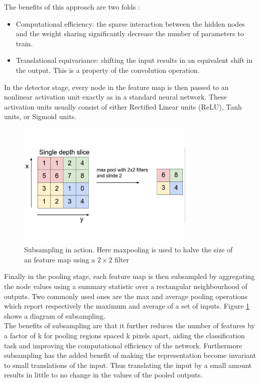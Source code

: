 \noindent The benefits of this approach are two folds :

\begin{itemize}
	\item Computational efficiency: the sparse interaction between the hidden nodes and the weight sharing significantly decrease the number of parameters to train.
	\item Translational equivariance: shifting the input results in an equivalent shift in the output. This is a property of the convolution operation.
\end{itemize}

\noindent In the detector stage, every node in the feature map is then passed to an nonlinear activation unit exactly as in a standard neural network. These activation units usually consist of either Rectified Linear units (ReLU), Tanh units, or Sigmoid units.\\

\begin{figure}
\centering
\includegraphics[trim=0cm 0cm 0cm 0cm, clip=true, height=60mm]{Chapter2/pooling.pdf}
\caption{Subsampling in action. Here maxpooling is used to halve the size of an feature map using a $2 \times 2$ filter}
\label{subsampling}
\end{figure}

\noindent Finally in the pooling stage, each feature map is then subsampled by aggregating the node values using a summary statistic over a rectangular neighbourhood of outputs. Two commonly used ones are the max and average pooling operations which report respectively the maximum and average of a set of inputs. Figure \ref{subsampling} shows a diagram of subsampling.\\

\noindent The benefits of subsampling are that it further reduces the number of features by a factor of k for pooling regions spaced k pixels apart, aiding the classification task and improving the computational efficiency of the network. Furthermore subsampling has the added benefit of making the representation become invariant to small translations of the input. Thus translating the input by a small amount results in little to no change in the values of the pooled outputs.\\

